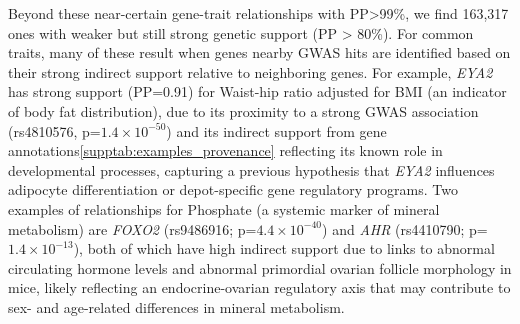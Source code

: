 \documentclass[sn-nature,lineno]{sn-jnl}%
\theoremstyle{thmstyleone}%
\theoremstyle{thmstyletwo}%
\theoremstyle{thmstylethree}%
\begin{document}

Beyond these near-certain gene-trait relationships with PP>99\%, we find 163,317 ones with weaker but still strong genetic support (PP > 80\%). For common traits, many of these result when genes nearby GWAS hits are identified based on their strong indirect support relative to neighboring genes. For example, {\it EYA2} has strong support (PP=0.91) for Waist-hip ratio adjusted for BMI (an indicator of body fat distribution), due to its proximity to a strong GWAS association (rs4810576, p=$1.4 \times 10^{-50}$) and its indirect support from gene annotations\ref{supptab:examples_provenance} reflecting its known role in developmental processes\cite{tadjuidje_eyes_2012}, capturing a previous hypothesis that {\it EYA2} influences adipocyte differentiation or depot-specific gene regulatory programs\cite{perrin_chromatin_2021}. Two examples of relationships for Phosphate (a systemic marker of mineral metabolism) are \textit{FOXO2} (rs9486916; p=$4.4\times10^{-40}$) and \textit{AHR} (rs4410790; p=$1.4\times10^{-13}$), both of which have high indirect support due to  links to abnormal circulating hormone levels and abnormal primordial ovarian follicle morphology in mice\cite{essaghir_transcription_2009,hernandez-ochoa_ability_2010}, likely reflecting an endocrine-ovarian regulatory axis that may contribute to sex- and age-related differences in mineral metabolism. 
\end{document}
